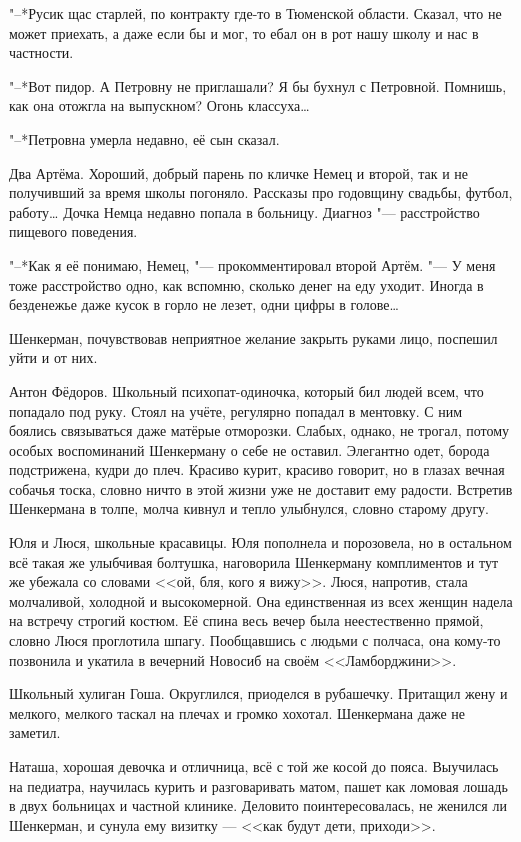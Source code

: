 "--*Русик щас старлей, по контракту где-то в Тюменской области.
Сказал, что не может приехать, а даже если бы и мог, то ебал он в рот нашу школу и нас в частности.

"--*Вот пидор.
А Петровну не приглашали?
Я бы бухнул с Петровной.
Помнишь, как она отожгла на выпускном?
Огонь классуха\ldots{}

"--*Петровна умерла недавно, её сын сказал.

Два Артёма.
Хороший, добрый парень по кличке Немец и второй, так и не получивший за время школы погоняло.
Рассказы про годовщину свадьбы, футбол, работу\ldots{}
Дочка Немца недавно попала в больницу.
Диагноз "--- расстройство пищевого поведения.

"--*Как я её понимаю, Немец, "--- прокомментировал второй Артём.
"--- У меня тоже расстройство одно, как вспомню, сколько денег на еду уходит.
Иногда в безденежье даже кусок в горло не лезет, одни цифры в голове\ldots{}

Шенкерман, почувствовав неприятное желание закрыть руками лицо, поспешил уйти и от них.

Антон Фёдоров.
Школьный психопат-одиночка, который бил людей всем, что попадало под руку.
Стоял на учёте, регулярно попадал в ментовку.
С ним боялись связываться даже матёрые отморозки.
Слабых, однако, не трогал, потому особых воспоминаний Шенкерману о себе не оставил.
Элегантно одет, борода подстрижена, кудри до плеч.
Красиво курит, красиво говорит, но в глазах вечная собачья тоска, словно ничто в этой жизни уже не доставит ему радости.
Встретив Шенкермана в толпе, молча кивнул и тепло улыбнулся, словно старому другу.

Юля и Люся, школьные красавицы.
Юля пополнела и порозовела, но в остальном всё такая же улыбчивая болтушка, наговорила Шенкерману комплиментов и тут же убежала со словами <<ой, бля, кого я вижу>>.
Люся, напротив, стала молчаливой, холодной и высокомерной.
Она единственная из всех женщин надела на встречу строгий костюм.
Её спина весь вечер была неестественно прямой, словно Люся проглотила шпагу.
Пообщавшись с людьми с полчаса, она кому-то позвонила и укатила в вечерний Новосиб на своём <<Ламборджини>>.

Школьный хулиган Гоша.
Округлился, приоделся в рубашечку.
Притащил жену и мелкого, мелкого таскал на плечах и громко хохотал.
Шенкермана даже не заметил.

Наташа, хорошая девочка и отличница, всё с той же косой до пояса.
Выучилась на педиатра, научилась курить и разговаривать матом, пашет как ломовая лошадь в двух больницах и частной клинике.
Деловито поинтересовалась, не женился ли Шенкерман, и сунула ему визитку --- <<как будут дети, приходи>>.

